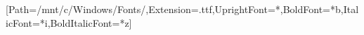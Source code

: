 \usepackage[a4paper,margin=2cm,top=1.8cm,bottom=1.8cm]{geometry}
\usepackage{fontspec}
\setmainfont{calibri}[Path=/mnt/c/Windows/Fonts/,Extension=.ttf,UprightFont=*,BoldFont=*b,ItalicFont=*i,BoldItalicFont=*z]
\usepackage{microtype}
\usepackage{titlesec}
\usepackage{enumitem}
\usepackage{booktabs}
\usepackage{array}
\usepackage{tabularx}
\usepackage{graphicx}
\usepackage{fancyvrb}
\usepackage{fancyhdr}
\usepackage{xcolor}
\color{negro}
\pagestyle{fancy}\fancyhf{}\renewcommand{\headrulewidth}{0pt}
\fancyfoot[C]{\small\thepage}
\setlength{\parindent}{0pt}\setlength{\parskip}{4pt}
\titlespacing*{\section}{0pt}{9pt}{3pt}
\renewcommand{\arraystretch}{1.15}

\usepackage[hidelinks,pdfencoding=auto]{hyperref}

